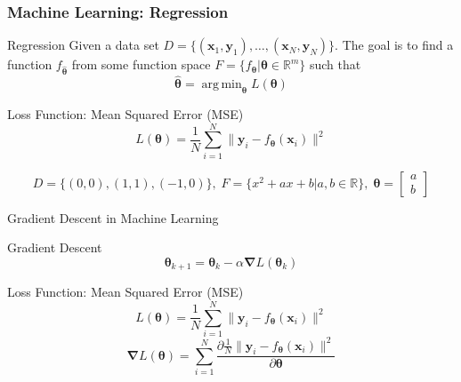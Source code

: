 \documentclass{beamer}
\DeclareMathOperator*{\argmin}{arg\,min}
\begin{document}
\begin{frame}
    \frametitle{Machine Learning: Regression}

    \begin{block}{Regression}
        Given a data set $D = \{(\boldsymbol{x}_1, \boldsymbol{y}_1), \dots, (\boldsymbol{x}_N, \boldsymbol{y}_N)\}$. The goal is to find a function $f_{\hat{\boldsymbol{\theta}}}$ from some function space $F = \{f_{\boldsymbol{\theta}} \vert \boldsymbol{\theta} \in \mathbb{R}^m\}$ such that
        \[\hat{\boldsymbol{\theta}} = \argmin_{\boldsymbol{\theta}} L(\boldsymbol{\theta})\]
    \end{block}
    
    \begin{block}{Loss Function: Mean Squared Error (MSE)}
        \[L(\boldsymbol{\theta}) = \frac{1}{N}\sum_{i = 1}^{N} \lVert\boldsymbol{y}_i - f_{\boldsymbol{\theta}}(\boldsymbol{x}_i)\rVert^2\]
    \end{block}

    \[D = \{(0, 0), (1, 1), (-1, 0)\},\; F = \{x^2 + ax + b \vert a, b \in \mathbb{R}\}, \;\boldsymbol{\theta} = \begin{bmatrix}
        a \\
        b
    \end{bmatrix}\]

\end{frame}

\begin{frame}{Gradient Descent in Machine Learning}

\begin{block}{Gradient Descent}
    \[\boldsymbol{\theta}_{k + 1} = \boldsymbol{\theta}_{k} - \alpha\boldsymbol{\nabla} L(\boldsymbol{\theta}_{k})\]
\end{block}
    
\begin{block}{Loss Function: Mean Squared Error (MSE)}
    \[L(\boldsymbol{\theta}) = \frac{1}{N}\sum_{i = 1}^{N} \lVert\boldsymbol{y}_i - f_{\boldsymbol{\theta}}(\boldsymbol{x}_i)\rVert^2\]
    \[\boldsymbol{\nabla}L(\boldsymbol{\theta}) = \sum_{i = 1}^{N}\frac{\partial\frac{1}{N}\lVert\boldsymbol{y}_i - f_{\boldsymbol{\theta}}(\boldsymbol{x}_i)\rVert^2}{\partial\boldsymbol{\theta}}\]
\end{block}

\end{frame}
\end{document}
